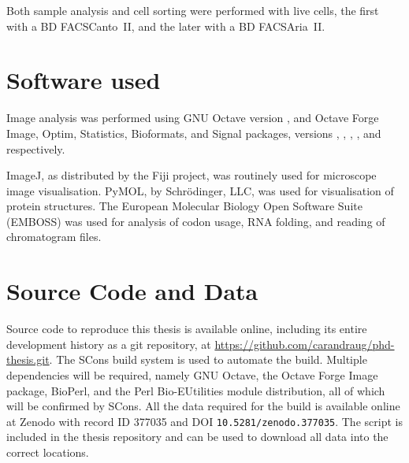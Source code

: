       Both sample analysis and cell sorting were performed with live cells, the
      first with a BD FACSCanto~II, and the later with a BD FACSAria~II.

  \section{Software used}
    \label{sec:methods:software}
    Image analysis was performed using GNU Octave version \OctaveVersion{},
    and Octave Forge Image, Optim, Statistics, Bioformats, and Signal
    packages, versions \OctaveImageVersion{}, \OctaveOptimVersion{},
    \OctaveStatisticsVersion{}, \OctaveBioformatsVersion{}, and
    \OctaveSignalVersion{} respectively.

    ImageJ, as distributed by the Fiji project, was routinely used
    for microscope image visualisation.  PyMOL, by Schrödinger, LLC,
    was used for visualisation of protein structures.
    The European Molecular Biology Open Software Suite (EMBOSS)
    was used for analysis of codon usage, RNA folding, and reading of
    chromatogram files.

  \section{Source Code and Data}
    Source code to reproduce this thesis is available online,
    including its entire development history as a git repository, at
    \url{https://github.com/carandraug/phd-thesis.git}.  The SCons build
    system is used to automate the build.  Multiple dependencies will
    be required, namely GNU Octave, the Octave Forge Image package,
    BioPerl, and the Perl Bio-EUtilities module distribution, all of
    which will be confirmed by SCons.  All the data required for the
    build is available online at Zenodo with record ID 377035 and
    DOI \texttt{10.5281/zenodo.377035}.  The script
     is included in the thesis repository and
    can be used to download all data into the correct locations.
